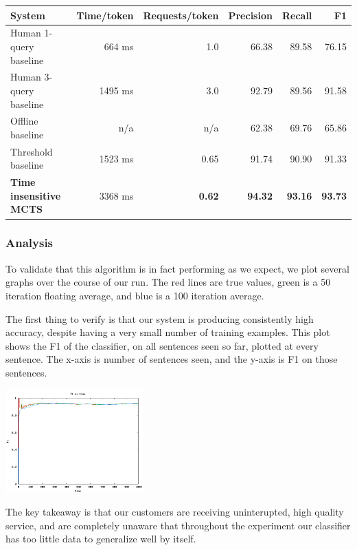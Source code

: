 \begin{center}
\begin{tabular}{ | l | r | r | r | r | r | }
    \hline
    \textbf{System} & \textbf{Time/token} & \textbf{Requests/token} & \textbf{Precision} & \textbf{Recall} & \textbf{F1} \\ \hline
    Human 1-query baseline & 664 ms & 1.0 & 66.38 & 89.58 & 76.15 \\ \hline
    Human 3-query baseline & 1495 ms & 3.0 & 92.79 & 89.56 & 91.58 \\ \hline
    Offline baseline & n/a & n/a & 62.38 & 69.76 & 65.86 \\ \hline
    Threshold baseline & 1523 ms & 0.65 & 91.74 & 90.90 & 91.33 \\ \hline
    \textbf{Time insensitive MCTS} & 3368 ms & \textbf{0.62} & \textbf{94.32} & \textbf{93.16} & \textbf{93.73} \\ \hline
\end{tabular}
\end{center}

\subsubsection{Analysis}

To validate that this algorithm is in fact performing as we expect, we plot several graphs over the course of our run.
The red lines are true values, green is a 50 iteration floating average, and blue is a 100 iteration average.

The first thing to verify is that our system is producing consistently high accuracy, despite having a very small number of
training examples. This plot shows the F1 of the classifier, on all sentences seen so far, plotted at every sentence.
The x-axis is number of sentences seen, and the y-axis is F1 on those sentences.

\begin{center}
\includegraphics[width=200px]{plots/f1_vs_time.png}
\end{center}

The key takeaway is that our customers are receiving uninterupted, high quality service, and are completely unaware that throughout the experiment our classifier has too little data to generalize well by itself.

